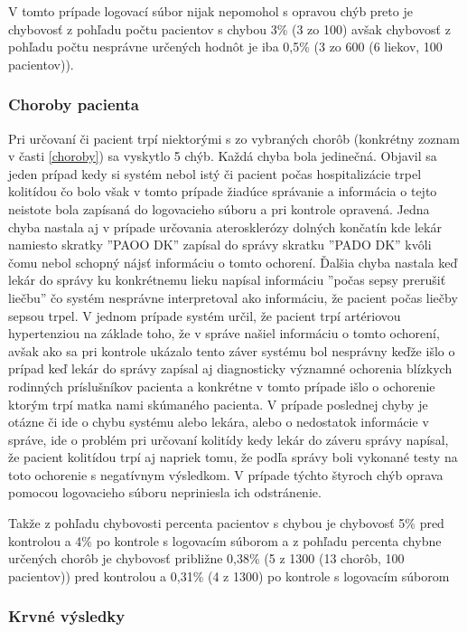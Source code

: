 V tomto prípade logovací súbor nijak nepomohol s opravou chýb preto je chybovosť z pohľadu počtu pacientov s chybou 3\% (3 zo 100) avšak chybovosť z pohľadu počtu nesprávne určených hodnôt je iba 0,5\% (3 zo 600 (6 liekov, 100 pacientov)).

\subsubsection{Choroby pacienta}

Pri určovaní či pacient trpí niektorými s zo vybraných chorôb (konkrétny zoznam v časti \ref{choroby}) sa vyskytlo 5 chýb. Každá chyba bola jedinečná. Objavil sa jeden prípad kedy si systém nebol istý či pacient počas hospitalizácie trpel kolitídou čo bolo však v tomto prípade žiadúce správanie a informácia o tejto neistote bola zapísaná do logovacieho súboru a pri kontrole opravená. Jedna chyba nastala aj v prípade určovania aterosklerózy dolných končatín kde lekár namiesto skratky ''PAOO DK'' zapísal do správy skratku  ''PADO DK'' kvôli čomu nebol schopný nájsť informáciu o tomto ochorení. Ďalšia chyba nastala keď lekár do správy ku konkrétnemu lieku napísal informáciu ''počas sepsy prerušiť liečbu'' čo systém nesprávne interpretoval ako informáciu, že pacient počas liečby sepsou trpel. V jednom prípade systém určil, že pacient trpí artériovou hypertenziou na základe toho, že v správe našiel informáciu o tomto ochorení, avšak ako sa pri kontrole ukázalo tento záver systému bol nesprávny keďže išlo o prípad keď lekár do správy zapísal aj diagnosticky významné ochorenia blízkych rodinných príslušníkov pacienta a konkrétne v tomto prípade išlo o ochorenie ktorým trpí matka nami skúmaného pacienta. V prípade poslednej chyby je otázne či ide o chybu systému alebo lekára, alebo o nedostatok informácie v správe, ide o problém pri určovaní kolitídy kedy lekár do záveru správy napísal, že pacient kolitídou trpí aj napriek tomu, že podľa správy boli vykonané testy na toto ochorenie s negatívnym výsledkom. V prípade týchto štyroch chýb oprava pomocou logovacieho súboru nepriniesla ich odstránenie.

Takže z pohľadu chybovosti percenta pacientov s chybou je chybovosť 5\% pred kontrolou a 4\% po kontrole s logovacím súborom a z pohľadu percenta chybne určených chorôb je chybovosť približne 0,38\% (5 z 1300 (13 chorôb, 100 pacientov)) pred kontrolou a 0,31\% (4 z 1300) po kontrole s logovacím súborom

\subsubsection{Krvné výsledky}

